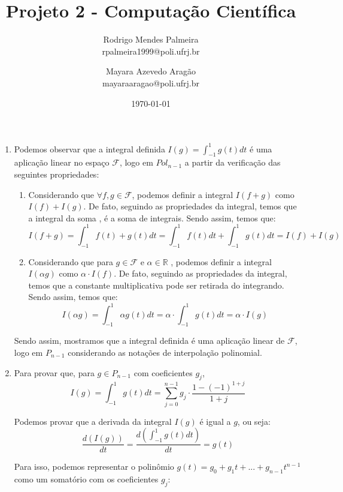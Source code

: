 \documentclass[12pt]{article}
\title{Projeto 2 - Computação Científica}
\author{Rodrigo Mendes Palmeira \\ {rpalmeira1999@poli.ufrj.br} 
   \and Mayara Azevedo Aragão\\  {mayaraaragao@poli.ufrj.br} }
\date{\today}
\begin{document}
\setlength{\parskip}{1em}
\maketitle

\begin{enumerate}[1.]

    \item Podemos observar que a integral definida  $ I(g) = \int_{-1}^{1} g(t)dt $ é uma aplicação linear no espaço $\mathcal{F}$, logo em $Pol_{n-1}$ a partir da verificação das seguintes propriedades:
        \bigskip
        \begin{enumerate}
		\item Considerando que $\forall f,g \in \mathcal{F}$, podemos definir a integral $ I(f + g)$ como $ I(f) + I(g) $. De fato, seguindo as propriedades da integral, temos que a integral da soma , é a soma de integrais. Sendo assim, temos que:
        $$  I(f + g) = \int_{-1}^{1} f(t)+g(t)dt  = \int_{-1}^{1} f(t)dt + \int_{-1}^{1} g(t)dt = I(f) + I(g) $$
        
		\item Considerando que para $g \in \mathcal{F}$ e $ \alpha \in \mathbb{R}$ , podemos definir a integral $ I(\alpha g)$ como $ \alpha \cdot I(f)  $. De fato, seguindo as propriedades da integral, temos que a constante multiplicativa pode ser retirada do integrando. Sendo assim, temos que:
        $$I(\alpha g) = \int_{-1}^{1} \alpha g(t)dt  = \alpha \cdot \int_{-1}^{1} g(t)dt = \alpha \cdot I(g)$$
        
	    \end{enumerate}
	    \bigskip
	    Sendo assim, mostramos que a integral definida é uma aplicação linear de $\mathcal{F}$, logo em $P_{n-1}$ considerando as notações de interpolação polinomial.
        
        
        

        
    \item Para provar que, para $g \in P_{n-1} $ com coeficientes $g_j$,
    $$ I(g) = \int_{-1}^{1} g(t)dt  = \sum_{j=0}^{n-1} g_j \cdot \frac{1- (-1)^{1+j}}{1+j} $$
    
    Podemos provar que a derivada da integral $I(g)$ é igual a $g$, ou seja:
    $$ \dfrac {d( I(g)) }{dt} = \dfrac {d( \int_{-1}^{1} g(t)dt) }{dt} = g(t)$$
    
    Para isso, podemos representar o polinômio $g(t) = g_0 + g_1 t + ... + g_{n-1} t^{n-1}$ como um somatório com os coeficientes $g_j$:
    

\end{enumerate}
\end{document}

